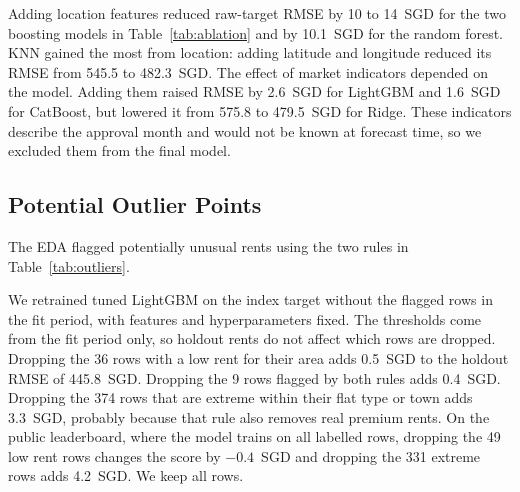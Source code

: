 Adding location features reduced raw-target RMSE by 10 to 14~SGD for the two boosting models in Table~\ref{tab:ablation} and by 10.1~SGD for the random forest. KNN gained the most from location: adding latitude and longitude reduced its RMSE from 545.5 to 482.3~SGD. The effect of market indicators depended on the model. Adding them raised RMSE by 2.6~SGD for LightGBM and 1.6~SGD for CatBoost, but lowered it from 575.8 to 479.5~SGD for Ridge. These indicators describe the approval month and would not be known at forecast time, so we excluded them from the final model.

\begin{table}[htbp]
\caption{Time holdout RMSE (SGD) by feature set, raw target. Parentheses give the number of available features. KNN uses only floor area, month and, when available, latitude and longitude.}
\label{tab:ablation}
\centering
\footnotesize
\setlength{\tabcolsep}{2.2pt}

\end{table}

\subsection{Potential Outlier Points}\label{sec:suspicious}

The EDA flagged potentially unusual rents using the two rules in Table~\ref{tab:outliers}.

\begin{table}[htbp]
\caption{Rows flagged by each outlier rule. All rows: thresholds and flags from all labelled rows, as in the EDA. Fit rows: thresholds and flags from the fit period only, which the holdout ablation drops.}
\label{tab:outliers}
\centering
\footnotesize

\end{table}

We retrained tuned LightGBM on the index target without the flagged rows in the fit period, with features and hyperparameters fixed. The thresholds come from the fit period only, so holdout rents do not affect which rows are dropped. Dropping the 36 rows with a low rent for their area adds 0.5~SGD to the holdout RMSE of 445.8~SGD. Dropping the 9 rows flagged by both rules adds 0.4~SGD. Dropping the 374 rows that are extreme within their flat type or town adds 3.3~SGD, probably because that rule also removes real premium rents. On the public leaderboard, where the model trains on all labelled rows, dropping the 49 low rent rows changes the score by $-0.4$~SGD and dropping the 331 extreme rows adds 4.2~SGD. We keep all rows.

